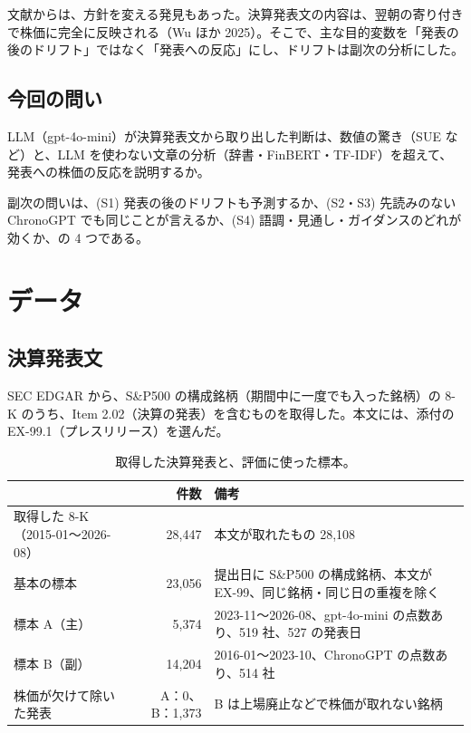 \documentclass[xelatex,ja=standard,jafont=haranoaji,a4paper,10pt,openany]{bxjsreport}
\newcommand{\SP}{S\&P500}
\begin{document}
文献からは、方針を変える発見もあった。決算発表文の内容は、翌朝の寄り付きで株価に完全に反映される（Wu ほか 2025）。そこで、主な目的変数を「発表の後のドリフト」ではなく「発表への反応」にし、ドリフトは副次の分析にした。

\section{今回の問い}

\begin{verdict}[主な問い]
LLM（gpt-4o-mini）が決算発表文から取り出した判断は、数値の驚き（SUE など）と、LLM を使わない文章の分析（辞書・FinBERT・TF-IDF）を超えて、発表への株価の反応を説明するか。
\end{verdict}

副次の問いは、(S1) 発表の後のドリフトも予測するか、(S2・S3) 先読みのない ChronoGPT でも同じことが言えるか、(S4) 語調・見通し・ガイダンスのどれが効くか、の 4 つである。

\chapter{データ}\label{ch:data}

\section{決算発表文}

SEC EDGAR から、\SP{} の構成銘柄（期間中に一度でも入った銘柄）の 8-K のうち、Item 2.02（決算の発表）を含むものを取得した。本文には、添付の EX-99.1（プレスリリース）を選んだ。

\begin{table}[htbp]
\centering
\caption{取得した決算発表と、評価に使った標本。}
\label{tab:data}
\small
\begin{tabular}{p{4.6cm}rp{6.6cm}}
\toprule
& 件数 & 備考 \\
\midrule
取得した 8-K（2015-01〜2026-08） & 28,447 & 本文が取れたもの 28,108 \\
基本の標本 & 23,056 & 提出日に \SP{} の構成銘柄、本文が EX-99、同じ銘柄・同じ日の重複を除く \\
標本 A（主） & 5,374 & 2023-11〜2026-08、gpt-4o-mini の点数あり、519 社、527 の発表日 \\
標本 B（副） & 14,204 & 2016-01〜2023-10、ChronoGPT の点数あり、514 社 \\
株価が欠けて除いた発表 & A：0、B：1,373 & B は上場廃止などで株価が取れない銘柄 \\
\bottomrule
\end{tabular}
\end{table}
\end{document}
